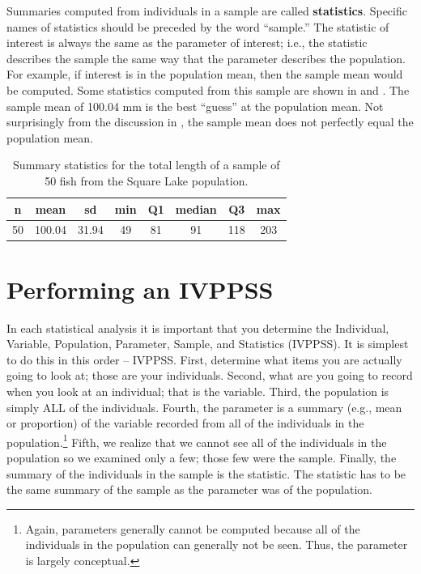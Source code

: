\documentclass[10pt,openany]{book}\usepackage[]{graphicx}\usepackage[]{color}
\begin{document}

Summaries computed from individuals in a sample are called \textbf{statistics}.  Specific names of statistics should be preceded by the word ``sample.''  The statistic of interest is always the same as the parameter of interest; i.e., the statistic describes the sample the same way that the parameter describes the population.  For example, if interest is in the population mean, then the sample mean would be computed.  Some statistics computed from this sample are shown in  and .  The sample mean of 100.04 mm is the best ``guess'' at the population mean.  Not surprisingly from the discussion in , the sample mean does not perfectly equal the population mean.

\begin{table}[ht]
\centering
\caption{Summary statistics for the total length of a sample of 50 fish from the Square Lake population.} 
\label{tab:SquareLakeSample1}
\begin{tabular}{cccccccc}
 n & mean & sd & min & Q1 & median & Q3 & max \\ 
  \hline
50 & 100.04 & 31.94 & 49 & 81 & 91 & 118 & 203 \\ 
   \hline
\end{tabular}
\end{table}



\section{Performing an IVPPSS}
In each statistical analysis it is important that you determine the Individual, Variable, Population, Parameter, Sample, and Statistics (IVPPSS).  It is simplest to do this in this order -- IVPPSS.  First, determine what items you are actually going to look at; those are your individuals.  Second, what are you going to record when you look at an individual; that is the variable.  Third, the population is simply ALL of the individuals.  Fourth, the parameter is a summary (e.g., mean or proportion) of the variable recorded from all of the individuals in the population.\footnote{Again, parameters generally cannot be computed because all of the individuals in the population can generally not be seen.  Thus, the parameter is largely conceptual.}  Fifth, we realize that we cannot see all of the individuals in the population so we examined only a few; those few were the sample.  Finally, the summary of the individuals in the sample is the statistic.  The statistic has to be the same summary of the sample as the parameter was of the population.
\end{document}
